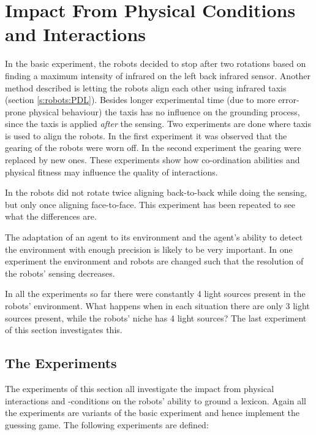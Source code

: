 \section{Impact From Physical Conditions and Interactions}\label{s:par:int}


In the basic experiment, the robots decided to stop after two rotations based on finding a maximum intensity of infrared on the left back infrared sensor. Another method described is letting the robots align each other using infrared taxis (section \ref{s:robots:PDL}). Besides longer experimental time (due to more error-prone physical behaviour) the taxis has no influence on the grounding process, since the taxis is applied {\em after} the sensing. Two experiments are done where taxis is used to align the robots. In the first experiment it was observed that the gearing of the robots were worn off. In the second experiment the gearing were replaced by new ones. These experiments show how co-ordination abilities and physical fitness may influence the quality of interactions.

In \citep{steelsvogt:1997} the robots did not rotate twice aligning back-to-back while doing the sensing, but only once aligning face-to-face. This experiment has been repeated to see what the differences are.

The adaptation of an agent to its environment and the agent's ability to detect the environment with enough precision is likely to be very important. In one experiment the environment and robots are changed such that the resolution of the robots' sensing decreases.

In all the experiments so far there were constantly 4 light sources present in the robots' environment. What happens when in each situation there are only 3 light sources present, while the robots' niche has 4 light sources? The last experiment of this section investigates this.

\subsection{The Experiments}

The experiments of this section all investigate the impact from physical interactions and -conditions on the robots' ability to ground a lexicon. Again all the experiments are variants of the basic experiment and hence implement the guessing game. The following experiments are defined:

